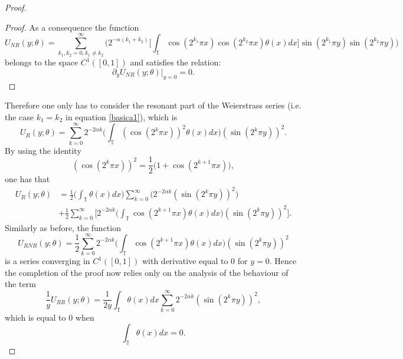 \documentclass[10pt,a4paper]{amsart}
\def \del {\partial}
\begin{document}
\begin{proof}
\begin{proof}
As a consequence  the function
\begin{equation*}
U_{NR}(y;\theta)= \sum_{k_1,k_2=0 , k_1\not=k_2}^\infty \bigg(2^{-\alpha (k_1 + k_2)} \bigg[ \int_{\mathbb{T}} \cos(2^{k_1}\pi x)  \cos(2^{k_2}\pi  x)\theta (x) dx \bigg] \sin(2^{k_1} \pi y)  \sin(2^{k_2} \pi y) \bigg)  
\end{equation*}
belongs to the space $C^{1}([0,1])$ and satisfies the relation:
\begin{equation}
\del_y U_{NR} (y;\theta) \lvert_{y=0} =0.
\end{equation}

\end{proof}
Therefore one only has to consider the resonant part of the Weierstrass series (i.e. the case $k_1 = k_2$ in equation \eqref{basica1}), which is
\begin{equation}
U_R(y;\theta) =  \sum_{k=0 }^\infty 2^{-2\alpha k} \bigg( \int_{\mathbb{T}} (\cos(2^{k } \pi  x)  )^2  \theta (x) dx \bigg)  (\sin(2^{k } \pi y))^2.
\end{equation}
By using the identity
\begin{equation}
 (\cos(2^{k } \pi x)  )^2=\frac12 \bigg(1+ \cos(2^{k+1 } \pi  x)  \bigg),
\end{equation}
one has that
\begin{align*}
U_R(y;\theta) &= \frac12 \bigg( \int_{\mathbb{T}} \theta (x) dx \bigg) \sum_{k =0}^\infty \bigg( 2^{-2\alpha k} (\sin(2^{k }\pi y) )^2 \bigg) \\
&+ \frac{1}{2} \sum_{k =0}^\infty \bigg[ 2^{-2\alpha k} \bigg( \int_{\mathbb{T}} \cos(2^{k +1}  \pi x)    \theta (x) dx \bigg) (\sin(2^{k } \pi y))^2 \bigg].
\end{align*}
Similarly as before, the function
\begin{equation}
U_{RNR}(y;\theta)= \frac{1}{2} \sum_{k=0}^\infty 2^{-2\alpha k} \bigg( \int_{\mathbb{T}} \cos(2^{k +1}\pi  x) \theta (x) dx \bigg)  (\sin(2^{k } \pi y))^2
\end{equation}
is a series converging in $C^{1}([0,1]) $ with derivative equal to $0$ for $y=0$.
Hence the completion of the proof now relies only on the analysis of the behaviour of the term
\begin{equation}
\frac{1}{y} U_{RR}(y;\theta)= \frac{1}{2y} \int_{\mathbb{T}} \theta (x) dx \sum_{k=0 }^\infty 2^{-2\alpha k} (\sin(2^{k } \pi y))^2,
\end{equation}
which is equal to $0$ when 
\begin{equation}
\int_{\mathbb{T}} \theta (x) dx =0.
\end{equation}

\end{proof}
\end{document}
